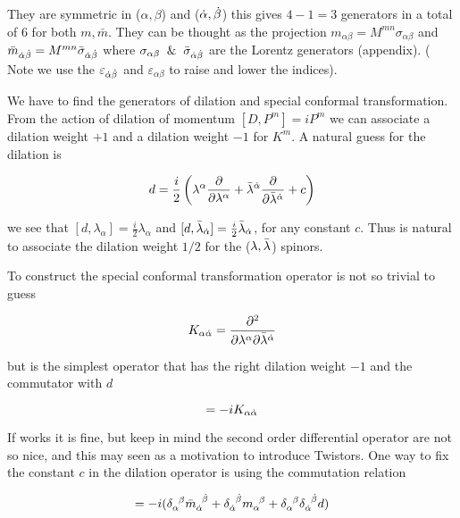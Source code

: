 They are symmetric in ($\alpha,\beta$) and ($\dot{\alpha},\dot{\beta}$) this gives $4-1=3$ generators in a total of $6$ for both $m,\bar{m}$. They can be thought as the projection $m_{\alpha \beta} = M^{mn} \sigma_{\alpha \beta}$ and $\bar{m}_{\dot{\alpha} \dot{\beta}} = M^{mn} \bar{\sigma}_{\dot{\alpha} \dot{\beta}}$ where $\sigma_{\alpha \beta} \;\;\&\;\; \bar{\sigma}_{\dot{\alpha} \dot{\beta}}$ are the Lorentz generators (appendix). ( Note we use the $\varepsilon_{\dot{\alpha} \dot{\beta}}$ and $\varepsilon_{\alpha \beta}$ to raise and lower the indices).

We have to find the generators of dilation and special conformal transformation. From the action of dilation of momentum $[D,P^{m}] = i P^{m}$ we can associate a dilation weight $+1$ and a dilation weight $-1$ for $K^{m}$. A natural guess for the dilation is 

\begin{equation}
d = \frac{i}{2}\left( \lambda^{\alpha} \frac{\partial}{\partial \lambda^{\alpha}}  + \bar{\lambda}^{\dot{\alpha}} \frac{\partial}{\partial \bar{\lambda}^{\dot{\alpha}}} + c \right) 
\end{equation}

we see that $[d,\lambda_{\alpha}] = \frac{i}{2}\lambda_{\alpha}$ and $[d,\bar{\lambda}_{\dot{\alpha}}] = \frac{i}{2}\bar{\lambda}_{\dot{\alpha}}$, for any  constant $c$. Thus is natural to associate the dilation weight $1/2$ for the ($\lambda,\bar{\lambda}$) spinors.

To construct the special conformal transformation operator is not so trivial to guess 

\begin{equation}
K_{\alpha \dot{\alpha}} = \frac{\partial^{2}}{\partial \lambda^{\alpha}\partial \bar{\lambda}^{\dot{\alpha}}} 
\end{equation}


but is the simplest operator that has the right dilation weight $-1$ and the commutator with $d$

\begin{equation}
[d,K_{\aad}] = -iK_{\aad}
\end{equation}


If works it is fine, but keep in  mind the second order differential operator are not so nice, and this may seen as a motivation to introduce Twistors.
One way to fix the constant $c$ in the dilation operator is using the commutation relation 

\begin{equation}
[K_{\aad},P^{\bdb}] = -i (\delta_{\alpha}^{\;\;\beta}\bar{m}_{\alphad}^{\;\;\betad} + \delta_{\alphad}^{\;\; \betad} m_{\alpha}^{\;\; \beta} + \delta_{\alpha}^{\;\; \beta} \delta_{\alphad}^{\;\; \betad}d  )
\label{eq.3.5}
\end{equation}

